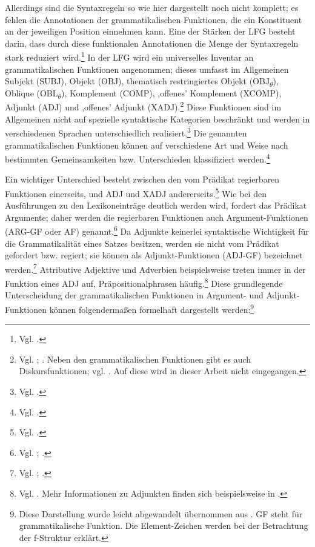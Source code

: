 \documentclass[12pt,a4paper]{article}
\begin{document}
Allerdings sind die Syntaxregeln so wie hier dargestellt noch nicht komplett; es fehlen die Annotationen der grammatikalischen Funktionen, die ein Konstituent an der jeweiligen Position einnehmen kann. Eine der Stärken der LFG besteht darin, dass durch diese funktionalen Annotationen die Menge der Syntaxregeln stark reduziert wird.\footnote{Vgl. \cite[45]{Dal}.} In der LFG wird ein universelles Inventar an grammatikalischen Funktionen angenommen; dieses umfasst im Allgemeinen Subjekt (SUBJ), Objekt (OBJ), thematisch restringiertes Objekt (OBJ\textsubscript{$\theta$}), Oblique (OBL\textsubscript{$\theta$}), Komplement (COMP), ,offenes' Komplement (XCOMP), Adjunkt (ADJ) und ,offenes' Adjunkt (XADJ).\footnote{Vgl. \cite[9]{Dal}; \cite[58]{Falk}. Neben den grammatikalischen Funktionen gibt es auch Diskursfunktionen; vgl. \cite[28; 76-84; 94-101]{Skript}. Auf diese wird in dieser Arbeit nicht eingegangen.} Diese Funktionen sind im Allgemeinen nicht auf spezielle syntaktische Kategorien beschränkt und werden in verschiedenen Sprachen unterschiedlich realisiert.\footnote{Vgl. \cite[9-10]{Bresnan}.} Die genannten grammatikalischen Funktionen können auf verschiedene Art und Weise nach bestimmten Gemeinsamkeiten bzw. Unterschieden klassifiziert werden.\footnote{Vgl. \cite[56-8]{Falk}.} 

Ein wichtiger Unterschied besteht zwischen den vom Prädikat regierbaren Funktionen einerseits, und ADJ und XADJ andererseits.\footnote{Vgl. \cite[56]{Falk}.} Wie bei den Ausführungen zu den Lexikoneinträge deutlich werden wird, fordert das Prädikat Argumente; daher werden die regierbaren Funktionen auch Argument-Funktionen (ARG-GF oder AF) genannt.\footnote{Vgl. \cite[28]{Skript}; \cite[58]{Falk}.} Da Adjunkte keinerlei syntaktische Wichtigkeit für die Grammatikalität eines Satzes besitzen, werden sie nicht vom Prädikat gefordert bzw. regiert; sie können als Adjunkt-Funktionen (ADJ-GF) bezeichnet werden.\footnote{Vgl. \cite[10-1]{Dal}; \cite[38]{Skript}.} Attributive Adjektive und Adverbien beispielsweise treten immer in der Funktion eines ADJ auf, Präpositionalphrasen häufig.\footnote{Vgl. \cite[38]{Skript}. Mehr Informationen zu Adjunkten finden sich beispielsweise in \cite[61-2]{Falk}.} Diese grundlegende Unterscheidung der grammatikalischen Funktionen in Argument- und Adjunkt-Funktionen können folgendermaßen formelhaft dargestellt werden:\footnote{Diese Darstellung wurde leicht abgewandelt übernommen aus \cite{Snijders}. GF steht für grammatikalische Funktion. Die Element-Zeichen werden bei der Betrachtung der f-Struktur erklärt.}
\end{document}
